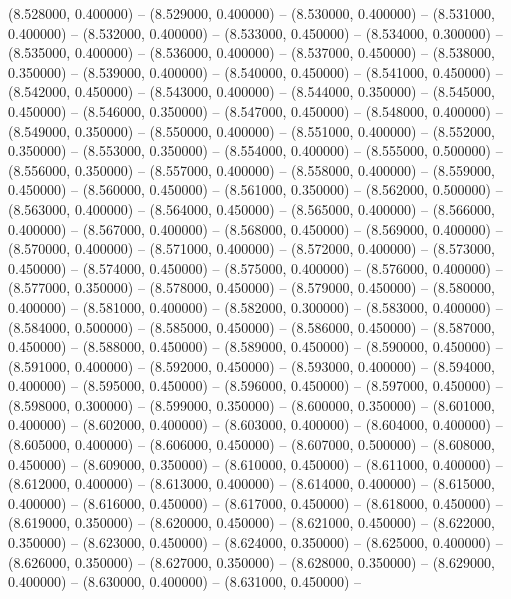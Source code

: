 (8.528000, 0.400000) -- 
(8.529000, 0.400000) -- 
(8.530000, 0.400000) -- 
(8.531000, 0.400000) -- 
(8.532000, 0.400000) -- 
(8.533000, 0.450000) -- 
(8.534000, 0.300000) -- 
(8.535000, 0.400000) -- 
(8.536000, 0.400000) -- 
(8.537000, 0.450000) -- 
(8.538000, 0.350000) -- 
(8.539000, 0.400000) -- 
(8.540000, 0.450000) -- 
(8.541000, 0.450000) -- 
(8.542000, 0.450000) -- 
(8.543000, 0.400000) -- 
(8.544000, 0.350000) -- 
(8.545000, 0.450000) -- 
(8.546000, 0.350000) -- 
(8.547000, 0.450000) -- 
(8.548000, 0.400000) -- 
(8.549000, 0.350000) -- 
(8.550000, 0.400000) -- 
(8.551000, 0.400000) -- 
(8.552000, 0.350000) -- 
(8.553000, 0.350000) -- 
(8.554000, 0.400000) -- 
(8.555000, 0.500000) -- 
(8.556000, 0.350000) -- 
(8.557000, 0.400000) -- 
(8.558000, 0.400000) -- 
(8.559000, 0.450000) -- 
(8.560000, 0.450000) -- 
(8.561000, 0.350000) -- 
(8.562000, 0.500000) -- 
(8.563000, 0.400000) -- 
(8.564000, 0.450000) -- 
(8.565000, 0.400000) -- 
(8.566000, 0.400000) -- 
(8.567000, 0.400000) -- 
(8.568000, 0.450000) -- 
(8.569000, 0.400000) -- 
(8.570000, 0.400000) -- 
(8.571000, 0.400000) -- 
(8.572000, 0.400000) -- 
(8.573000, 0.450000) -- 
(8.574000, 0.450000) -- 
(8.575000, 0.400000) -- 
(8.576000, 0.400000) -- 
(8.577000, 0.350000) -- 
(8.578000, 0.450000) -- 
(8.579000, 0.450000) -- 
(8.580000, 0.400000) -- 
(8.581000, 0.400000) -- 
(8.582000, 0.300000) -- 
(8.583000, 0.400000) -- 
(8.584000, 0.500000) -- 
(8.585000, 0.450000) -- 
(8.586000, 0.450000) -- 
(8.587000, 0.450000) -- 
(8.588000, 0.450000) -- 
(8.589000, 0.450000) -- 
(8.590000, 0.450000) -- 
(8.591000, 0.400000) -- 
(8.592000, 0.450000) -- 
(8.593000, 0.400000) -- 
(8.594000, 0.400000) -- 
(8.595000, 0.450000) -- 
(8.596000, 0.450000) -- 
(8.597000, 0.450000) -- 
(8.598000, 0.300000) -- 
(8.599000, 0.350000) -- 
(8.600000, 0.350000) -- 
(8.601000, 0.400000) -- 
(8.602000, 0.400000) -- 
(8.603000, 0.400000) -- 
(8.604000, 0.400000) -- 
(8.605000, 0.400000) -- 
(8.606000, 0.450000) -- 
(8.607000, 0.500000) -- 
(8.608000, 0.450000) -- 
(8.609000, 0.350000) -- 
(8.610000, 0.450000) -- 
(8.611000, 0.400000) -- 
(8.612000, 0.400000) -- 
(8.613000, 0.400000) -- 
(8.614000, 0.400000) -- 
(8.615000, 0.400000) -- 
(8.616000, 0.450000) -- 
(8.617000, 0.450000) -- 
(8.618000, 0.450000) -- 
(8.619000, 0.350000) -- 
(8.620000, 0.450000) -- 
(8.621000, 0.450000) -- 
(8.622000, 0.350000) -- 
(8.623000, 0.450000) -- 
(8.624000, 0.350000) -- 
(8.625000, 0.400000) -- 
(8.626000, 0.350000) -- 
(8.627000, 0.350000) -- 
(8.628000, 0.350000) -- 
(8.629000, 0.400000) -- 
(8.630000, 0.400000) -- 
(8.631000, 0.450000) -- 
